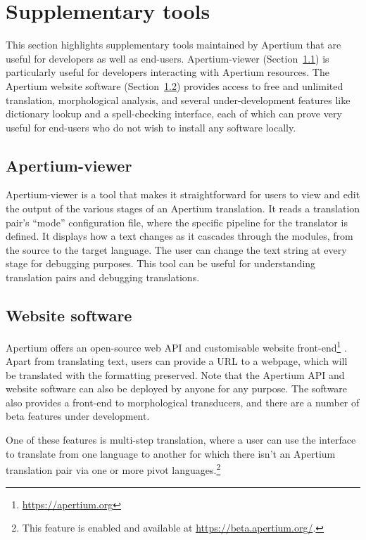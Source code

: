 \documentclass[free]{flammie}
\begin{document}
\section{Supplementary tools}\label{sec:OtherValuableTools}

This section highlights supplementary tools maintained by Apertium that are
useful for developers as well as end-users. Apertium-viewer
(Section~\ref{sec:ApertiumViewer}) is particularly useful for developers
interacting with Apertium resources.  The Apertium website software
(Section~\ref{sec:website}) provides access to free and unlimited translation,
morphological analysis, and several under-development features like dictionary
lookup and a spell-checking interface, each of which can prove very useful for
end-users who do not wish to install any software locally.

\subsection{Apertium-viewer}\label{sec:ApertiumViewer}
Apertium-viewer is a tool that makes it straightforward for users to view and
edit the output of the various stages of an Apertium translation. It reads a
translation pair's ``mode'' configuration file, where the specific pipeline for
the translator is defined. It displays how a text changes as it cascades through
the modules, from the source to the target language. The user can change the
text string at every stage for debugging purposes. This tool can be useful for
understanding translation pairs and debugging translations.

\subsection{Website software}\label{sec:website}
Apertium offers an open-source web API and customisable website
front-end\footnote{\url{https://apertium.org}} \cite{cherivirala2018apertium}.
Apart from translating text, users can provide a URL to a webpage, which will be
translated with the formatting preserved. Note that the Apertium API and website
software can also be deployed by anyone for any purpose. The software also
provides a front-end to morphological transducers, and there are a number of
beta features under development.

One of these features is multi-step translation, where a user can use the
interface to translate from one language to another for which there isn't an
Apertium translation pair via one or more pivot languages.\footnote{This feature
is enabled and available at \url{https://beta.apertium.org/}.}
\end{document}
